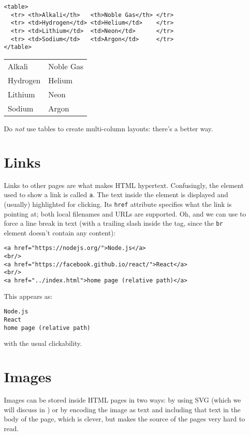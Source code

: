 \begin{verbatim}
<table>
  <tr> <th>Alkali</th>   <th>Noble Gas</th> </tr>
  <tr> <td>Hydrogen</td> <td>Helium</td>    </tr>
  <tr> <td>Lithium</td>  <td>Neon</td>      </tr>
  <tr> <td>Sodium</td>   <td>Argon</td>     </tr>
</table>
\end{verbatim}

\begin{longtable}{ll}
Alkali & Noble Gas \\
Hydrogen & Helium \\
Lithium & Neon \\
Sodium & Argon \\
\end{longtable}

Do \emph{not} use tables to create multi-column layouts:
there's a better way.

\section{Links}\label{s:htmlcss-links}

Links to other pages are what makes HTML hypertext.
Confusingly,
the element used to show a link is called \texttt{a}.
The text inside the element is displayed and (usually) highlighted for clicking.
Its \texttt{href} attribute specifies what the link is pointing at;
both local filenames and URLs are supported.
Oh,
and we can use \texttt{} to force a line break in text
(with a trailing slash inside the tag, since the \texttt{br} element doesn't contain any content):

\begin{verbatim}
<a href="https://nodejs.org/">Node.js</a>
<br/>
<a href="https://facebook.github.io/react/">React</a>
<br/>
<a href="../index.html">home page (relative path)</a>
\end{verbatim}

This appears as:

\begin{verbatim}
Node.js
React
home page (relative path)
\end{verbatim}

\noindent
with the usual clickability.

\section{Images}\label{s:htmlcss-images}

Images can be stored inside HTML pages in two ways:
by using SVG (which we will discuss in )
or by encoding the image as text and including that text in the body of the page,
which is clever,
but makes the source of the pages very hard to read.

